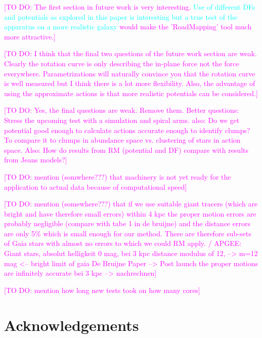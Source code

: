 \documentclass[iop,revtex4]{emulateapj}
\newcommand{\HW}[1]{\textcolor{Cyan}{#1}}
\newcommand{\Wilma}[1]{\textcolor{Magenta}{#1}}
\begin{document}
\Wilma{[TO DO: The first section in future work is very interesting. \HW{Use of different DFs and potentials as explored in this paper is interesting but a true test of the apparatus on a more realistic galaxy} would make the 'RoadMapping' tool much more attractive.]}

\Wilma{[TO DO: I think that the final two questions of the future work section are weak. Clearly the rotation curve is only describing the in-plane force not the force everywhere. Parametrizations will naturally convince you that the rotation curve is well measured but I think there is a lot more flexibility. Also, the advantage of using the approximate actions is that more realistic potentials can be considered.]}

\Wilma{[TO DO: Yes, the final questions are weak. Remove them. Better questions: Stress the upcoming test with a simulation and spiral arms. also: Do we get potential good enough to calculate actions accurate enough to identify clumps? To compare it to clumps in abundance space vs. clustering of stars in action space. Also: How do results from RM (potential and DF) compare with results from Jeans models?]}

\Wilma{[TO DO: mention (somwhere???) that machinery is not yet ready for the application to actual data because of computational speed]}

\Wilma{[TO DO: mention (somewhere???) that if we use suitable giant tracers (which are bright and have therefore small errors) within 4 kpc the proper motion errors are probably negligible (compare with tabe 1 in de bruijne) and the distance errors are only 5\% which is small enough for our method. There are therefore sub-sets of Gaia stars with almost no errors to which we could RM apply. / APGEE: Giant stars, absolut helligkeit 0 mag, bei 3 kpc distance modulus
of 12, --> m=12 mag <-- bright limit of gaia
De Bruijne Paper --> Post launch
the proper motions are infinitely accurate bei 3 kpc --> nachrechnen]}

\Wilma{[TO DO: mention how long new tests took on how many cores]}

\section{Acknowledgements}
\end{document}
